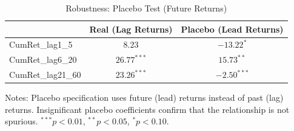 \begin{table}[htbp]\centering
\caption{Robustness: Placebo Test (Future Returns)}
\label{tab:placebo}
\begin{tabular}{lcc}
\toprule
 & Real (Lag Returns) & Placebo (Lead Returns) \\
\midrule
CumRet\_lag1\_5 & $8.23$ & $-13.22^{*}$ \\
CumRet\_lag6\_20 & $26.77^{***}$ & $15.73^{**}$ \\
CumRet\_lag21\_60 & $23.26^{***}$ & $-2.50^{***}$ \\
\bottomrule
\end{tabular}
\begin{tablenotes}\small
\item Notes: Placebo specification uses future (lead) returns instead of past (lag)
returns. Insignificant placebo coefficients confirm that the relationship is not spurious.
$^{***}p<0.01$, $^{**}p<0.05$, $^{*}p<0.10$.
\end{tablenotes}
\end{table}